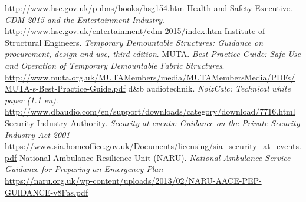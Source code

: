 \begin{thebibliography}{18}
    \href{http://www.hse.gov.uk/pubns/books/hsg154.htm}{http://www.hse.gov.uk/pubns/books/hsg154.htm}
    Health and Safety Executive.
    \textit{CDM 2015 and the Entertainment Industry}. \\
    \href{http://www.hse.gov.uk/entertainment/cdm-2015/index.htm}{http://www.hse.gov.uk/entertainment/cdm-2015/index.htm}
    Institute of Structural Engineers.
    \textit{Temporary Demountable Structures: Guidance on procurement, design and use, third edition}.
    MUTA.
    \textit{Best Practice Guide: Safe Use and Operation of Temporary Demountable Fabric Structures}. \\
    \href{http://www.muta.org.uk/MUTAMembers/media/MUTAMembersMedia/PDFs/MUTA-s-Best-Practice-Guide.pdf}{http://www.muta.org.uk/MUTAMembers/media/MUTAMembersMedia/PDFs/MUTA-s-Best-Practice-Guide.pdf}
    d\&b audiotechnik.
        \textit{NoizCalc: Technical white paper (1.1 en)}. \\
    \href{http://www.dbaudio.com/en/support/downloads/category/download/7716.html}{http://www.dbaudio.com/en/support/downloads/category/download/7716.html}
    Security Industry Authority.
        \textit{Security at events: Guidance on the Private Security Industry Act 2001} \\
    \href{https://www.sia.homeoffice.gov.uk/Documents/licensing/sia\_security\_at\_events.pdf}{https://www.sia.homeoffice.gov.uk/Documents/licensing/sia\_security\_at\_events.pdf}
    National Ambulance Resilience Unit (NARU).
    \textit{National Ambulance Service Guidance for Preparing an Emergency Plan} \\
    \href{https://naru.org.uk/wp-content/uploads/2013/02/NARU-AACE-PEP-GUIDANCE-v8Fas.pdf}{https://naru.org.uk/wp-content/uploads/2013/02/NARU-AACE-PEP-GUIDANCE-v8Fas.pdf}
\end{thebibliography}
